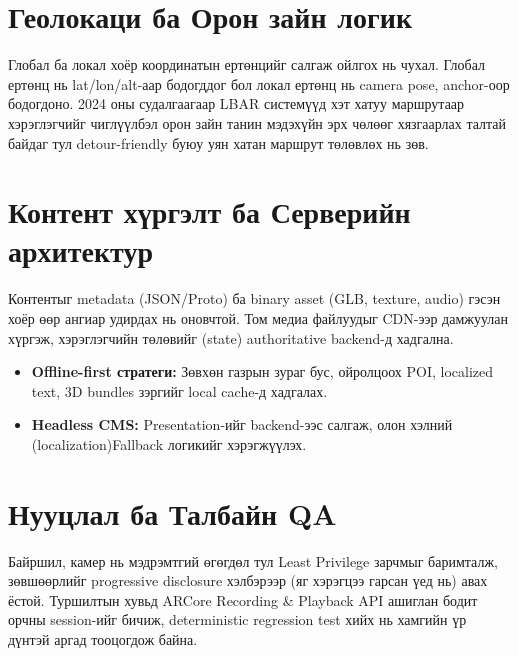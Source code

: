 \begin{sloppy}
\section*{Геолокаци ба Орон зайн логик}
Глобал ба локал хоёр координатын ертөнцийг салгаж ойлгох нь чухал. Глобал ертөнц нь lat/lon/alt-аар бодогддог бол локал ертөнц нь camera pose, anchor-оор бодогдоно. 2024 оны судалгаагаар LBAR системүүд хэт хатуу маршрутаар хэрэглэгчийг чиглүүлбэл орон зайн танин мэдэхүйн эрх чөлөөг хязгаарлах талтай байдаг тул detour-friendly буюу уян хатан маршрут төлөвлөх нь зөв.

\section*{Контент хүргэлт ба Серверийн архитектур}
Контентыг metadata (JSON/Proto) ба binary asset (GLB, texture, audio) гэсэн хоёр өөр ангиар удирдах нь оновчтой. Том медиа файлуудыг CDN-ээр дамжуулан хүргэж, хэрэглэгчийн төлөвийг (state) authoritative backend-д хадгална.
\begin{itemize}
    \item \textbf{Offline-first стратеги:} Зөвхөн газрын зураг бус, ойролцоох POI, localized text, 3D bundles зэргийг local cache-д хадгалах.
    \item \textbf{Headless CMS:} Presentation-ийг backend-ээс салгаж, олон хэлний (localization)Fallback логикийг хэрэгжүүлэх.
\end{itemize}

\section*{Нууцлал ба Талбайн QA}
Байршил, камер нь мэдрэмтгий өгөгдөл тул Least Privilege зарчмыг баримталж, зөвшөөрлийг progressive disclosure хэлбэрээр (яг хэрэгцээ гарсан үед нь) авах ёстой. Туршилтын хувьд ARCore Recording \& Playback API ашиглан бодит орчны session-ийг бичиж, deterministic regression test хийх нь хамгийн үр дүнтэй аргад тооцогдож байна.

\end{sloppy}
